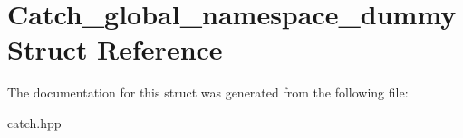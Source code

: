 \hypertarget{structCatch__global__namespace__dummy}{}\section{Catch\+\_\+global\+\_\+namespace\+\_\+dummy Struct Reference}
\label{structCatch__global__namespace__dummy}


The documentation for this struct was generated from the following file\+:\begin{DoxyCompactItemize}
\item 
catch.\+hpp\end{DoxyCompactItemize}
